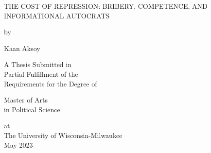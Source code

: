\thispagestyle{empty}
   \begin{center}
       \vspace*{1cm}

       THE COST OF REPRESSION: BRIBERY, COMPETENCE, AND INFORMATIONAL AUTOCRATS
            
       \vspace{1cm}
       
       by
       
       \vspace{1cm}

       Kaan Aksoy
       \vfill
            
       A Thesis Submitted in\\
       Partial Fulfillment of the\\
       Requirements for the Degree of
       
       \vspace{2cm}
       
       Master of Arts\\
       in Political Science
                   
       \vspace{0.8cm}
       
       at\\
       The University of Wisconsin-Milwaukee\\
       May 2023
            
   \end{center}